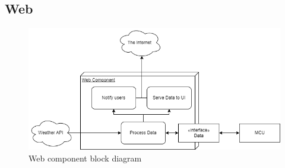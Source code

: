 \subsection{Web}
\begin{figure}[H]
    \caption{Web component block diagram}
    \centering
    \includegraphics[width=\textwidth]{block-diagrams/images/WebBlock.png}
\end{figure}
